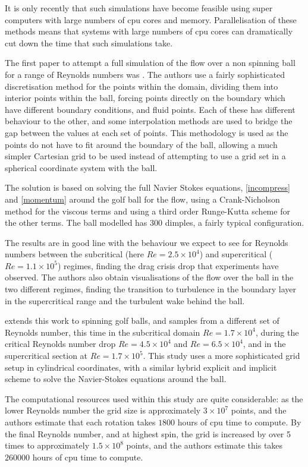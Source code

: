 It is only recently that such simulations have become feasible using super computers with large numbers
of cpu cores and memory. Parallelisation of these methods means that systems with large numbers of
cpu cores can dramatically cut down the time that such simulations take.

The first paper to attempt a full simulation of the flow over a non spinning ball for a range of
Reynolds numbers was \citet{Smith2010}. The authors use a fairly sophisticated discretisation method
for the points within the domain, dividing them into interior points within the ball, forcing points
directly on the boundary which have different boundary conditions, and fluid points. Each of these has
different behaviour to the other, and some interpolation methods are used to bridge the gap between
the values at each set of points. This methodology is used as the points do not have to fit around
the boundary of the ball, allowing a much simpler Cartesian grid to be used instead of attempting to
use a grid set in a spherical coordinate system with the ball.

The solution is based on solving the full Navier Stokes equations, \eqref{incompress} and \eqref{momentum}
around the golf ball for the flow, using a Crank-Nicholson method for the viscous terms and using
a third order Runge-Kutta scheme for the other terms. The ball modelled has 300 dimples, a fairly
typical configuration.

The results are in good line with the behaviour we expect to see for Reynolds numbers between the
subcritical (here $Re = 2.5\times10^4$) and supercritical ($Re = 1.1\times10^5$) regimes, finding the 
drag crisis drop that experiments have observed.
The authors also obtain visualisations of the flow over the ball in the two different regimes, finding
the transition to turbulence in the boundary layer in the supercritical range and the turbulent wake 
behind the ball.

\citet{Beratlis2012Numerical} extends this work to spinning golf balls, and samples from a different
set of Reynolds number, this time in the subcritical domain $Re = 1.7\times10^4$, during the critical
Reynolds number drop $Re = 4.5\times10^4$ and $Re = 6.5\times10^4$, and in the supercritical section
at $Re = 1.7\times10^5$. This study uses a more sophisticated grid setup in cylindrical coordinates,
with a similar hybrid explicit and implicit scheme to solve the Navier-Stokes equations around the ball.

The computational resources used within this study are quite considerable: as the lower Reynolds 
number the grid size is approximately $3\times10^7$ points, and the authors estimate that each rotation
takes $1800$ hours of cpu time to compute. By the final Reynolds number, and at highest spin, the grid
is increased by over 5 times to approximately $1.5\times10^8$ points, and the authors estimate this
takes $260000$ hours of cpu time to compute.


